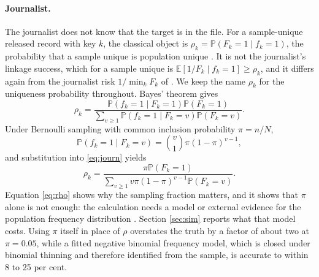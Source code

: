 \documentclass[11pt,a4paper]{article}
\theoremstyle{plain}
\theoremstyle{definition}
\theoremstyle{definition}
\theoremstyle{plain}
\newcommand{\Prob}{\mathbb{P}}
\newcommand{\E}{\mathbb{E}}
\begin{document}
\paragraph{Journalist.}
The journalist does not know that the target is in the file. For a
sample-unique released record with key $k$, the classical object is
$\rho_k = \Prob(F_k = 1 \mid f_k = 1)$, the probability that a sample unique is
population unique \citep{skinnerholmes1998,skinner2002}. It is not the
journalist's linkage success, which for a sample unique is
$\E[1/F_k \mid f_k = 1] \geq \rho_k$, and it differs again from the journalist
risk $1/\min_k F_k$ of \citet{elemam2008}. We keep the name $\rho_k$ for the
uniqueness probability throughout. Bayes' theorem gives
\begin{equation}
\rho_k = \frac{\Prob(f_k = 1 \mid F_k = 1)\Prob(F_k = 1)}
{\sum_{v \geq 1}\Prob(f_k = 1 \mid F_k = v)\Prob(F_k = v)} .
\label{eq:journ}
\end{equation}
Under Bernoulli sampling with common inclusion probability $\pi = n/N$,
\begin{equation}
\Prob(f_k = 1 \mid F_k = v) = \binom{v}{1}\pi(1-\pi)^{v-1} ,
\label{eq:binom}
\end{equation}
and substitution into \eqref{eq:journ} yields
\begin{equation}
\rho_k = \frac{\pi \Prob(F_k = 1)}
{\sum_{v \geq 1} v\pi(1-\pi)^{v-1}\Prob(F_k = v)} .
\label{eq:rho}
\end{equation}
Equation \eqref{eq:rho} shows why the sampling fraction matters, and it shows
that $\pi$ alone is not enough: the calculation needs a model or external
evidence for the population frequency distribution
\citep{skinner2002,reiter2005,rinott2006}. Section \ref{sec:sim} reports what
that model costs. Using $\pi$ itself in place of $\rho$ overstates the truth
by a factor of about two at $\pi = 0.05$, while a fitted negative binomial frequency model, which is closed under
binomial thinning and therefore identified from the sample, is accurate to within 8 to
25 per cent.
\end{document}
